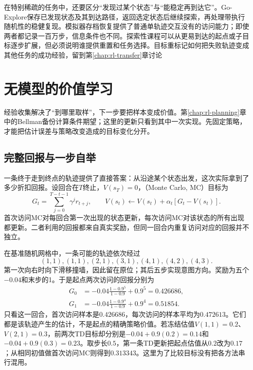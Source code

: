 在特别稀疏的任务中，还要区分“发现过某个状态”与“能稳定再到达它”。Go-Explore保存已发现状态及其到达路径，返回选定状态后继续探索，再处理带执行随机性的稳健复现。模拟器存档恢复提供了普通单轨迹交互没有的访问能力；即使两者都记录一百万步，信息条件也不同。探索性课程可以从更易到达的起点或子目标逐步扩展，但必须说明谁提供重置和任务选择。目标重标记如何把失败轨迹变成其他任务的成功经验，留到第\ref{chap:rl-transfer}章讨论

\section{无模型的价值学习}
\label{sec:rl-learning-value}

经验收集解决了“到哪里取样”，下一步要把样本变成价值。第\ref{chap:rl-planning}章中的Bellman备份计算条件期望；这里的更新只看到其中一次实现。先固定策略，才能把估计误差与策略改变造成的目标变化分开。

\subsection{完整回报与一步自举}
\label{sec:rl-learning-mc-td}

一条终于走到终点的轨迹提供了直接答案：从沿途某个状态出发，这次实际拿到了多少折扣回报。设回合在$T$终止，$V(s_T)=0$，（Monte Carlo, MC）目标为
\begin{equation}
  G_t=\sum_{j=0}^{T-t-1}\gamma^j r_{t+j},
  \qquad
  V(s_t)\leftarrow V(s_t)+\alpha_t[G_t-V(s_t)].
  \label{eq:rl-learning-mc}
\end{equation}
首次访问MC对每回合第一次出现的状态更新，每次访问MC对该状态的所有出现都更新。二者利用的回报都来自真实奖励，但同一回合内重复访问对应的回报并不独立。

\begin{example}[同一终止轨迹上的不同目标]
  \label{ex:rl-learning-mc-td}
  在基准随机网格中，一条可能的轨迹依次经过
  \[
    (1,1),(1,1),(2,1),(3,1),(4,1),(4,2),(4,3).
  \]
  第一次向右时向下滑移撞墙，因此留在原位；其后五步实现意图方向。奖励为五个$-0.04$和末步的1。于是起点两次访问的回报分别为
  \[
    \begin{aligned}
      G_0&=-0.04\frac{1-0.9^5}{1-0.9}+0.9^5=0.426686,\\
      G_1&=-0.04\frac{1-0.9^4}{1-0.9}+0.9^4=0.51854.
    \end{aligned}
  \]
  只看这一回合，首次访问样本是$0.426686$，每次访问的样本平均为$0.472613$。它们都是该轨迹产生的估计，不是起点的精确策略价值。若冻结估值$V(1,1)=0.2$、$V(2,1)=0.3$，前两次TD目标却分别是$-0.04+0.9(0.2)=0.14$和$-0.04+0.9(0.3)=0.23$。取步长$0.5$，第一条TD更新把起点估值从$0.2$改为$0.17$；从相同初值做首次访问MC则得到$0.313343$。这里为了比较目标没有把各方法串行混用。
\end{example}

